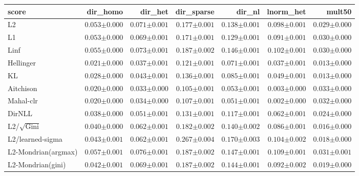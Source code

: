 \begin{tabular}{lrrrrrr}
\toprule
score & dir\_homo & dir\_het & dir\_sparse & dir\_nl & lnorm\_het & mult50 \\
\midrule
L2 & $0.053{\scriptstyle\pm0.000}$ & $0.071{\scriptstyle\pm0.001}$ & $0.177{\scriptstyle\pm0.001}$ & $0.138{\scriptstyle\pm0.001}$ & $0.098{\scriptstyle\pm0.001}$ & $0.029{\scriptstyle\pm0.000}$ \\
L1 & $0.053{\scriptstyle\pm0.000}$ & $0.069{\scriptstyle\pm0.001}$ & $0.171{\scriptstyle\pm0.001}$ & $0.129{\scriptstyle\pm0.001}$ & $0.091{\scriptstyle\pm0.001}$ & $0.030{\scriptstyle\pm0.000}$ \\
Linf & $0.055{\scriptstyle\pm0.000}$ & $0.073{\scriptstyle\pm0.001}$ & $0.187{\scriptstyle\pm0.002}$ & $0.146{\scriptstyle\pm0.001}$ & $0.102{\scriptstyle\pm0.001}$ & $0.030{\scriptstyle\pm0.000}$ \\
Hellinger & $0.021{\scriptstyle\pm0.000}$ & $0.037{\scriptstyle\pm0.001}$ & $0.121{\scriptstyle\pm0.001}$ & $0.071{\scriptstyle\pm0.001}$ & $0.037{\scriptstyle\pm0.001}$ & $0.013{\scriptstyle\pm0.000}$ \\
KL & $0.028{\scriptstyle\pm0.000}$ & $0.043{\scriptstyle\pm0.001}$ & $0.136{\scriptstyle\pm0.001}$ & $0.085{\scriptstyle\pm0.001}$ & $0.049{\scriptstyle\pm0.001}$ & $\mathbf{0.013}{\scriptstyle\pm0.000}$ \\
Aitchison & $0.020{\scriptstyle\pm0.000}$ & $\mathbf{0.033}{\scriptstyle\pm0.000}$ & $\mathbf{0.105}{\scriptstyle\pm0.001}$ & $0.053{\scriptstyle\pm0.001}$ & $0.003{\scriptstyle\pm0.000}$ & $0.033{\scriptstyle\pm0.000}$ \\
Mahal-clr & $\mathbf{0.020}{\scriptstyle\pm0.000}$ & $0.034{\scriptstyle\pm0.000}$ & $0.107{\scriptstyle\pm0.001}$ & $\mathbf{0.051}{\scriptstyle\pm0.001}$ & $\mathbf{0.002}{\scriptstyle\pm0.000}$ & $0.032{\scriptstyle\pm0.000}$ \\
DirNLL & $0.038{\scriptstyle\pm0.000}$ & $0.051{\scriptstyle\pm0.001}$ & $0.131{\scriptstyle\pm0.001}$ & $0.117{\scriptstyle\pm0.001}$ & $0.062{\scriptstyle\pm0.001}$ & $0.024{\scriptstyle\pm0.000}$ \\
L2/$\sqrt{\mathrm{Gini}}$ & $0.040{\scriptstyle\pm0.000}$ & $0.062{\scriptstyle\pm0.001}$ & $0.182{\scriptstyle\pm0.002}$ & $0.140{\scriptstyle\pm0.002}$ & $0.086{\scriptstyle\pm0.001}$ & $0.016{\scriptstyle\pm0.000}$ \\
L2/learned-sigma & $0.043{\scriptstyle\pm0.001}$ & $0.062{\scriptstyle\pm0.001}$ & $0.267{\scriptstyle\pm0.004}$ & $0.170{\scriptstyle\pm0.003}$ & $0.104{\scriptstyle\pm0.002}$ & $0.018{\scriptstyle\pm0.000}$ \\
L2-Mondrian(argmax) & $0.057{\scriptstyle\pm0.001}$ & $0.076{\scriptstyle\pm0.001}$ & $0.187{\scriptstyle\pm0.002}$ & $0.147{\scriptstyle\pm0.001}$ & $0.109{\scriptstyle\pm0.001}$ & $0.031{\scriptstyle\pm0.001}$ \\
L2-Mondrian(gini) & $0.042{\scriptstyle\pm0.001}$ & $0.069{\scriptstyle\pm0.001}$ & $0.187{\scriptstyle\pm0.002}$ & $0.144{\scriptstyle\pm0.001}$ & $0.092{\scriptstyle\pm0.002}$ & $0.019{\scriptstyle\pm0.000}$ \\
\bottomrule
\end{tabular}